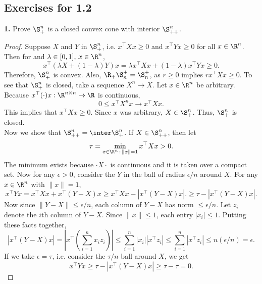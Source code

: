 \documentclass[../borwein-lewis_notes.tex]{subfiles}
\begin{document}
\subsection{Exercises for 1.2}
\noindent\textbf{1.} Prove $\S_+^n$ is a closed convex cone with 
interior $\S^n_{++}$.
\begin{proof}
Suppose $X$ and $Y$ in $\S^n_+$, i.e. $x^\top Xx\geq 0$ and 
$x^\top Y x\geq0$ for all $x\in\R^n$. Then for and $\lambda\in[0,1],
\,x\in\R^n$,
\begin{equation*}
x^\top(\lambda X + (1-\lambda)Y)x = \lambda x^\top X x + (1-\lambda) x^\top
Y x \geq 0.
\end{equation*}
Therefore, $\S_+^n$ is convex. Also, $\R_+\S_n^+=\S_n^+$, as $r\geq 0$ 
implies $rx^\top X x\geq 0$.
 To see that $\S_+^n$ is closed, take a sequence 
$X^n\to X$. Let $x\in\R^n$ be arbitrary. Because $x^\top (\cdot) x 
: \R^{n\times n}\to \R$ is continuous, 
\begin{equation*}
0 \leq x^\top X^n x \to x^\top X x.
\end{equation*}
This implies that $x^\top X x \geq 0$. Since $x$ was arbitrary, $X\in
\S_+^n$. Thus, $\S_+^n$ is closed. \\
Now we show that $\S_{++}^n = \inter \S_+^n$. If $X\in\S_{++}^n$, then 
let 
\begin{equation*}
\tau = \min_{x\in\R^n\,:\,\|x\|=1} x^\top X x > 0.
\end{equation*}
The minimum exists because $\cdot X \cdot$ is continuous and it is 
taken over a compact set. Now for any $\epsilon > 0$, consider the 
$Y$ in the ball of radius $\epsilon/n$ around $X$. For any 
$x\in\R^n$ with $\|x\|=1$, 
\begin{equation*}
x^\top Y x = x^\top X x + x^\top (Y-X)x \geq x^\top X x - |x^\top(Y-X)x|.
\geq \tau - |x^\top(Y-X)x|.
\end{equation*}
Now since $\|Y-X\|\leq\epsilon/n$, each column of $Y-X$ has norm $\leq 
\epsilon/n$. Let $z_i$ denote the $i$th column of $Y-X$. Since $\|x\|\leq
1$, each entry $|x_i|\leq 1$. Putting these facts together, 
\begin{equation*}
|x^\top (Y-X)x| = \left|x^\top(\sum_{i=1}^n x_i z_i)\right|
\leq \sum_{i=1}^n |x_i| |x^\top z_i| \leq \sum_{i=1}^n |x^\top z_i|
\leq n(\epsilon/n)=\epsilon.
\end{equation*}
If we take $\epsilon = \tau$, i.e. consider the $\tau/n$ ball around 
$X$, we get 
\begin{equation*}
x^\top Y x \geq \tau - |x^\top (Y-X)x| \geq \tau-\tau = 0.
\end{equation*}

\end{proof}
\end{document}
